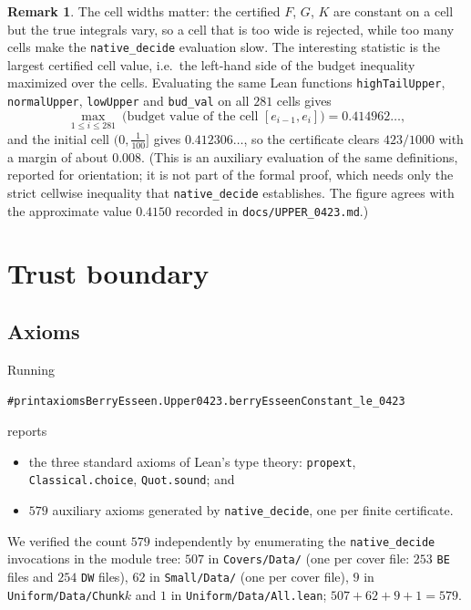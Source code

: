 \documentclass[11pt,a4paper]{article}
\newenvironment{leancode}{\par\smallskip\begin{alltt}\small}{\end{alltt}\smallskip}
\theoremstyle{definition}
\newtheorem{remark}[theorem]{Remark}
\newcommand{\Lean}[1]{\texttt{#1}}
\newcommand{\file}[1]{\texttt{#1}}
\begin{document}
\begin{remark}
  The cell widths matter: the certified $F$, $G$, $K$ are constant on a cell but
  the true integrals vary, so a cell that is too wide is rejected, while too many
  cells make the \Lean{native\_decide} evaluation slow. The interesting statistic
  is the largest certified cell value, i.e.\ the left-hand side of the budget
  inequality maximized over the cells. Evaluating the same Lean functions
  \Lean{highTailUpper}, \Lean{normalUpper}, \Lean{lowUpper} and \Lean{bud\_val}
  on all $281$ cells gives
  \[
    \max_{1\le i\le 281}\ \bigl(\text{budget value of the cell }
      [e_{i-1},e_i]\bigr) = 0.414962\ldots,
  \]
  and the initial cell $(0,\tfrac1{100}]$ gives $0.412306\ldots$, so the
  certificate clears $423/1000$ with a margin of about $0.008$. (This is an
  auxiliary evaluation of the same definitions, reported for orientation; it is
  not part of the formal proof, which needs only the strict cellwise inequality
  that \Lean{native\_decide} establishes. The figure agrees with the
  approximate value $0.4150$ recorded in \file{docs/UPPER\_0423.md}.)
\end{remark}

\section{Trust boundary}
\label{sec:trust}

\subsection{Axioms}

Running
\begin{leancode}
#print axioms BerryEsseen.Upper0423.berryEsseenConstant_le_0423
\end{leancode}
reports
\begin{itemize}[leftmargin=1.6em]
\item the three standard axioms of Lean's type theory: \Lean{propext},
  \Lean{Classical.choice}, \Lean{Quot.sound}; and
\item $579$ auxiliary axioms generated by \Lean{native\_decide}, one per finite
  certificate.
\end{itemize}
We verified the count $579$ independently by enumerating the \Lean{native\_decide}
invocations in the module tree: $507$ in \file{Covers/Data/} (one per cover file:
$253$ \file{BE} files and $254$ \file{DW} files), $62$ in \file{Small/Data/} (one
per cover file), $9$ in \file{Uniform/Data/Chunk}$k$ and $1$ in
\file{Uniform/Data/All.lean}; $507+62+9+1=579$.
\end{document}
